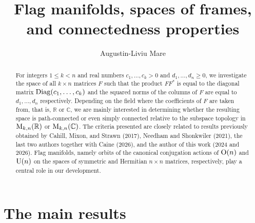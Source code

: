 \documentclass[12pt]{amsart}
\theoremstyle{definition}
\theoremstyle{remark}
\newcommand{\RR}{\mathbb R}
\newcommand{\CC}{\mathbb C}
\begin{document}
\address{Department of Mathematics and Statistics\\ University of Regina\\ Canada}




\title{Flag manifolds, spaces of frames, and connectedness properties}


\author{Augustin-Liviu Mare}


\begin{abstract} For integers $1\le k < n$ and real numbers $c_1, \ldots, c_k>0$ and $d_1, \ldots, d_n\ge 0$, we investigate the space 
of all $k\times n$ matrices $F$ such that the product $FF^*$ is equal to the diagonal matrix ${\rm Diag}(c_1, \ldots, c_k)$ and the squared norms of the columns of $F$ are equal to $d_1, \ldots, d_n$ respectively. Depending on the field where the coefficients of $F$ are taken from, that is, $\RR$ or $\CC$, we are mainly interested in determining whether the resulting space is path-connected or even simply connected relative to the subspace topology in ${\rm M}_{k,n}(\RR)$ or ${\rm M}_{k,n}(\CC)$. The criteria presented are closely related to results previously obtained by Cahill, Mixon, and Strawn (2017), Needham and Shonkwiler (2021), the last two authors together with Caine (2026), and the author of this work (2024 and 2026). Flag manifolds, namely  orbits of the canonical conjugation actions of ${\rm O}(n)$ and ${\rm U}(n)$ on the spaces of symmetric and Hermitian $n\times n$ matrices, respectively, play a central role in our development.\end{abstract}
\maketitle

\section{The main results} \label{sec:mainres}
\end{document}
